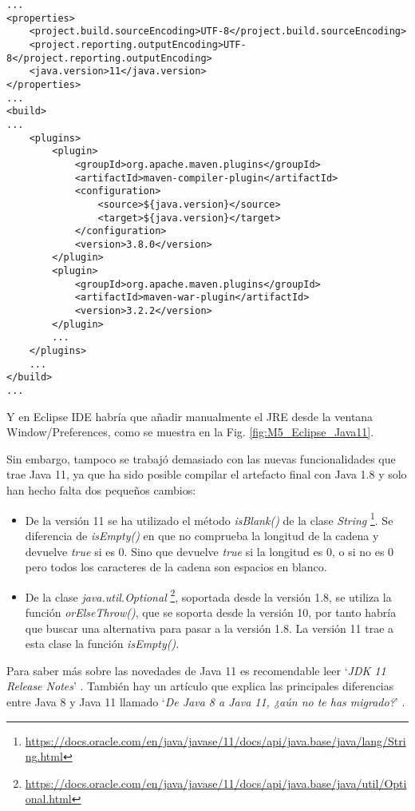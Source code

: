 \begin{minipage}{\linewidth}
{\tiny
\begin{lstlisting}[breaklines]
...
<properties>
	<project.build.sourceEncoding>UTF-8</project.build.sourceEncoding>
	<project.reporting.outputEncoding>UTF-8</project.reporting.outputEncoding>
	<java.version>11</java.version>
</properties>
...
<build>
...
	<plugins>
		<plugin>
			<groupId>org.apache.maven.plugins</groupId>
			<artifactId>maven-compiler-plugin</artifactId>
			<configuration>
				<source>${java.version}</source>
				<target>${java.version}</target>
			</configuration>
			<version>3.8.0</version>
		</plugin>
		<plugin>
			<groupId>org.apache.maven.plugins</groupId>
			<artifactId>maven-war-plugin</artifactId>
			<version>3.2.2</version>
		</plugin>
		...
	</plugins>
	...
</build>
...
\end{lstlisting}
}
\end{minipage}

Y en Eclipse IDE habría que añadir manualmente el JRE desde la ventana Window/Preferences, como se muestra en la Fig. \ref{fig:M5_Eclipse_Java11}.


Sin embargo, tampoco se trabajó demasiado con las nuevas funcionalidades que trae Java 11, ya que ha sido posible compilar el artefacto final con Java 1.8 y solo han hecho falta dos pequeños cambios:
\begin{itemize}
	\item De la versión 11 se ha utilizado el método \textit{isBlank()} de la clase \textit{String} \footnote{\url{https://docs.oracle.com/en/java/javase/11/docs/api/java.base/java/lang/String.html}}. Se diferencia de \textit{isEmpty()} en que no comprueba la longitud de la cadena y devuelve \textit{true} si es 0. Sino que devuelve \textit{true} si la longitud es 0, o si no es 0 pero todos los caracteres de la cadena son espacios en blanco.
	\item De la clase \textit{java.util.Optional} \footnote{\url{https://docs.oracle.com/en/java/javase/11/docs/api/java.base/java/util/Optional.html}}, soportada desde la versión 1.8, se utiliza la función \textit{orElseThrow()}, que se soporta desde la versión 10, por tanto habría que buscar una alternativa para pasar a la versión 1.8. La versión 11 trae a esta clase la función \textit{isEmpty()}.
\end{itemize}

Para saber más sobre las novedades de Java 11 es recomendable leer `\textit{JDK 11 Release Notes}' \citep{noauthor_jdk_nodate}. También hay un artículo que explica las principales diferencias entre Java 8 y Java 11 llamado `\textit{De Java 8 a Java 11, ¿aún no te has migrado?}' \citep{hoyo_java_2019}.

